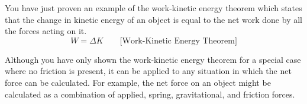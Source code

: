 You have just proven an example of the work-kinetic energy theorem which 
states that the change in kinetic energy of an object is equal to the net work 
done by all the forces acting on it.
\[
W=\Delta K\qquad \mbox{[Work-Kinetic Energy Theorem]}\]


Although you have only shown the work-kinetic energy theorem for a special 
case where no friction is present, it can be applied to any situation in which 
the net force can be calculated. For example, the net force on an object might 
be calculated as a combination of applied, spring, gravitational, and friction 
forces.

